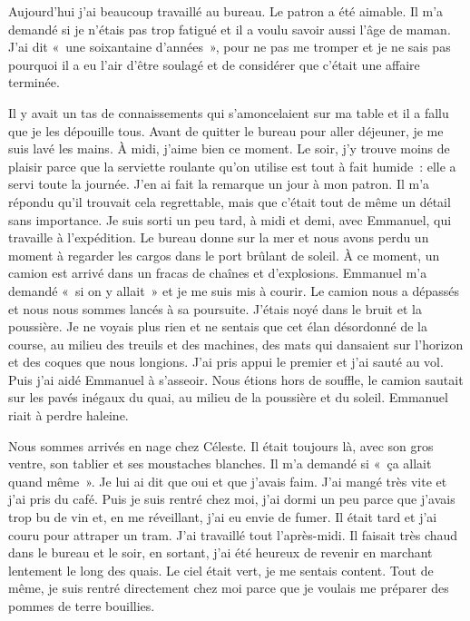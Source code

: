 \documentclass[french,twoside]{book} %
\newcommand\chaptercont{} %
\begin{document}
\chaptercont
\noindent Aujourd’hui j’ai beaucoup travaillé au bureau. Le patron a été aimable. Il m’a demandé si je n’étais pas trop fatigué et il a voulu savoir aussi l’âge de maman. J'ai dit « une soixantaine d’années », pour ne pas me tromper et je ne sais pas pourquoi il a eu l’air d’être soulagé et de considérer que c’était une affaire terminée.\par
Il y avait un tas de connaissements qui s’amoncelaient sur ma table et il a fallu que je les dépouille tous. Avant de quitter le bureau pour aller déjeuner, je me suis lavé les mains. À midi, j’aime bien ce moment. Le soir, j’y trouve moins de plaisir parce que la serviette roulante qu’on utilise est tout à fait humide : elle a servi toute la journée. J'en ai fait la remarque un jour à mon patron. Il m’a répondu qu’il trouvait cela regrettable, mais que c’était tout de même un détail sans importance. Je suis sorti un peu tard, à midi et demi, avec Emmanuel, qui travaille à l’expédition. Le bureau donne sur la mer et nous avons perdu un moment à regarder les cargos dans le port brûlant de soleil. À ce moment, un camion est arrivé dans un fracas de chaînes et d’explosions. Emmanuel m’a demandé « si on y allait » et je me suis mis à courir. Le camion nous a dépassés et nous nous sommes lancés à sa poursuite. J'étais noyé dans le bruit et la poussière. Je ne voyais plus rien et ne sentais que cet élan désordonné de la course, au milieu des treuils et des machines, des mats qui dansaient sur l’horizon et des coques que nous longions. J'ai pris appui le premier et j’ai sauté au vol. Puis j’ai aidé Emmanuel à s’asseoir. Nous étions hors de souffle, le camion sautait sur les pavés inégaux du quai, au milieu de la poussière et du soleil. Emmanuel riait à perdre haleine.\par
Nous sommes arrivés en nage chez Céleste. Il était toujours là, avec son gros ventre, son tablier et ses moustaches blanches. Il m’a demandé si « ça allait quand même ». Je lui ai dit que oui et que j’avais faim. J'ai mangé très vite et j’ai pris du café. Puis je suis rentré chez moi, j’ai dormi un peu parce que j’avais trop bu de vin et, en me réveillant, j’ai eu envie de fumer. Il était tard et j’ai couru pour attraper un tram. J'ai travaillé tout l’après-midi. Il faisait très chaud dans le bureau et le soir, en sortant, j’ai été heureux de revenir en marchant lentement le long des quais. Le ciel était vert, je me sentais content. Tout de même, je suis rentré directement chez moi parce que je voulais me préparer des pommes de terre bouillies.\par
\end{document}
